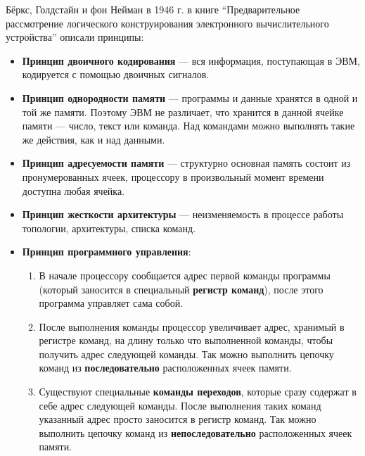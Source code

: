 Бёркс, Голдстайн и фон Нейман в 1946 г. в книге \enquote{Предварительное рассмотрение логического конструирования электронного вычислительного устройства}  описали принципы:
\begin{itemize}
    \item \textbf{Принцип двоичного кодирования} --- вся информация, поступающая в ЭВМ, кодируется с помощью двоичных сигналов.
    \item \textbf{Принцип однородности памяти} --- программы и данные хранятся в одной и той же памяти. Поэтому ЭВМ не различает, что хранится в данной ячейке памяти --- число, текст или команда. Над командами можно выполнять такие же действия, как и над данными.
    \item \textbf{Принцип адресуемости памяти} --- структурно основная память состоит из пронумерованных ячеек, процессору в произвольный момент времени доступна любая ячейка.
    \item \textbf{Принцип жесткости архитектуры} --- неизменяемость в процессе работы топологии, архитектуры, списка команд.
    \item \textbf{Принцип программного управления}:
          \begin{enumerate}
              \item В начале процессору сообщается адрес первой команды программы (который заносится в специальный \textbf{регистр команд}), после этого программа управляет сама собой.
              \item После выполнения команды процессор увеличивает адрес, хранимый в регистре команд, на длину только что выполненной команды, чтобы получить адрес следующей команды. Так можно выполнить цепочку команд из \textbf{последовательно} расположенных ячеек памяти.
              \item Существуют специальные \textbf{команды переходов}, которые сразу содержат в себе адрес следующей команды. После выполнения таких команд указанный адрес просто заносится в регистр команд. Так можно выполнить цепочку команд из \textbf{непоследовательно} расположенных ячеек памяти.
          \end{enumerate}
\end{itemize}
